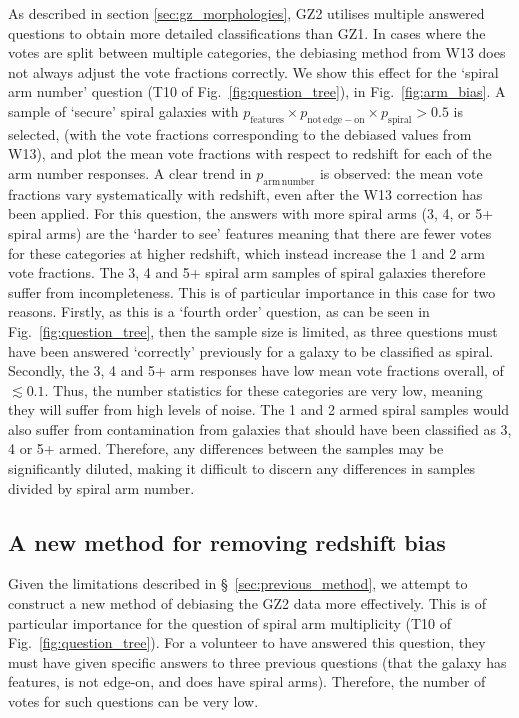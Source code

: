 \documentclass[useAMS,usenatbib]{mn2e}
\begin{document}
As described in section \ref{sec:gz_morphologies}, GZ2 utilises multiple answered questions to obtain more detailed classifications than GZ1. In cases where the votes are split between multiple categories, the debiasing method from W13 does not always adjust the vote fractions correctly. We show this effect for the `spiral arm number' question (T10 of Fig.~\ref{fig:question_tree}), in Fig.~\ref{fig:arm_bias}. A sample of `secure' spiral galaxies with $p_{\mathrm{features}} \times p_{\mathrm{not \, edge-on}} \times p_{\mathrm{spiral}} > 0.5$ is selected, (with the vote fractions corresponding to the debiased values from W13), and plot the mean vote fractions with respect to redshift for each of the arm number responses. A clear trend in $p_\mathrm{arm \, number}$ is observed: the mean vote fractions vary systematically with redshift, even after the W13 correction has been applied. For this question, the answers with more spiral arms (3, 4, or 5+ spiral arms) are the `harder to see' features meaning that there are fewer votes for these categories at higher redshift, which instead increase the 1 and 2 arm vote fractions. The 3, 4 and 5+ spiral arm samples of spiral galaxies therefore suffer from incompleteness. This is of particular importance in this case for two reasons. Firstly, as this is a `fourth order' question, as can be seen in Fig.~\ref{fig:question_tree}, then the sample size is limited, as three questions must have been answered `correctly' previously for a galaxy to be classified as spiral. Secondly, the 3, 4 and 5+ arm responses have low mean vote fractions overall, of $\lesssim 0.1$. Thus, the number statistics for these categories are very low, meaning they will suffer from high levels of noise. The 1 and 2 armed spiral samples would also suffer from contamination from galaxies that should have been classified as 3, 4 or 5+ armed. Therefore, any differences between the samples may be significantly diluted, making it difficult to discern any differences in samples divided by spiral arm number. 


\subsection{A new method for removing redshift bias}
\label{sec:new_method}

Given the limitations described in \S~\ref{sec:previous_method}, we attempt to construct a new method of debiasing the GZ2 data more effectively. This is of particular importance for the question of spiral arm multiplicity (T10 of Fig.~\ref{fig:question_tree}). For a volunteer to have answered this question, they must have given specific answers to three previous questions (that the galaxy has features, is not edge-on, and does have spiral arms). Therefore, the number of votes for such questions can be very low. 
\end{document}
